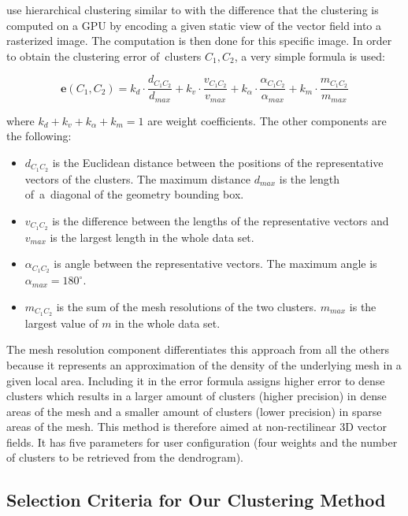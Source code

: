 \citet{Peng12} use hierarchical clustering similar to \citet{Telea99} with the difference that the clustering is computed on a GPU by encoding a given static view of the vector field into a rasterized image. The computation is then done for this specific image. In order to obtain the clustering error of~clusters \(C_1, C_2\), a very simple formula is used:

\begin{equation} \label{eq:clustering_error}
\bm{e}(C_1,C_2) = k_d \cdot \frac{d_{C_1C_2}}{d_{max}} + k_v \cdot \frac{v_{C_1C_2}}{v_{max}} + k_\alpha \cdot \frac{\alpha_{C_1C_2}}{\alpha_{max}} + k_m \cdot \frac{m_{C_1C_2}}{m_{max}}
\end{equation}

where \(k_d + k_v + k_\alpha + k_m = 1\) are weight coefficients. The other components are the following:

\begin{itemize}
\item \(d_{C_1C_2}\) is the Euclidean distance between the positions of the representative vectors of the clusters. The maximum distance \(d_{max}\) is the length of~a~diagonal of the geometry bounding box.
\item \(v_{C_1C_2}\) is the difference between the lengths of the representative vectors and \(v_{max}\) is the largest length in the whole data set.
\item \(\alpha_{C_1C_2}\) is angle between the representative vectors. The maximum angle is \(\alpha_{max} = 180^\circ\).
\item \(m_{C_1C_2}\) is the sum of the mesh resolutions of the two clusters. \(m_{max}\) is the largest value of \(m\) in the whole data set.
\end{itemize}

The mesh resolution component differentiates this approach from all the others because it represents an approximation of the density of the underlying mesh in a given local area. Including it in the error formula assigns higher error to dense clusters which results in a larger amount of clusters (higher precision) in dense areas of the mesh and a smaller amount of clusters (lower precision) in sparse areas of the mesh. This method is therefore aimed at non-rectilinear 3D vector fields. It has five parameters for user configuration (four weights and the number of clusters to be retrieved from the dendrogram).
\subsection{Selection Criteria for Our Clustering Method}
\label{subsec:analysis-field_clustering-sel_criteria}

